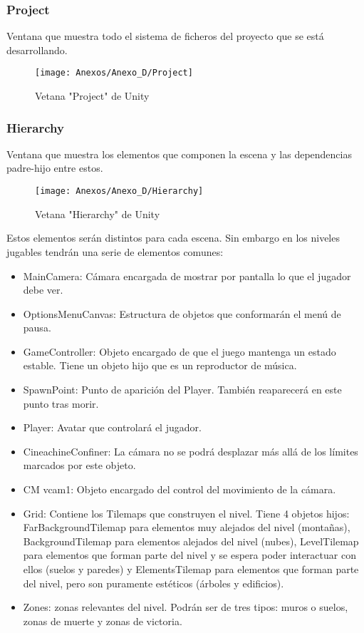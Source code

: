 \subsubsection{Project}
Ventana que muestra todo el sistema de ficheros del proyecto que se está desarrollando.

\begin{figure}[h]
\centering
\texttt{[image: Anexos/Anexo\_D/Project]}
\caption{Vetana "Project" de Unity}
\end{figure}
\clearpage

\subsubsection{Hierarchy}
Ventana que muestra los elementos que componen la escena y las dependencias padre-hijo entre estos.

\begin{figure}[h]
\centering
\texttt{[image: Anexos/Anexo\_D/Hierarchy]}
\caption{Vetana "Hierarchy" de Unity}
\end{figure}

Estos elementos serán distintos para cada escena. Sin embargo en los niveles jugables tendrán una serie de elementos comunes:
\begin{itemize}
\item
MainCamera: Cámara encargada de mostrar por pantalla lo que el jugador debe ver.
\item
OptionsMenuCanvas: Estructura de objetos que conformarán el menú de pausa.
\item
GameController: Objeto encargado de que el juego mantenga un estado estable. Tiene un objeto hijo que es un reproductor de música.
\item
SpawnPoint: Punto de aparición del Player. También reaparecerá en este punto tras morir.
\item
Player: Avatar que controlará el jugador.
\item
CineachineConfiner: La cámara no se podrá desplazar más allá de los límites marcados por este objeto.
\item
CM vcam1: Objeto encargado del control del movimiento de la cámara.
\item
Grid: Contiene los Tilemaps que construyen el nivel. Tiene 4 objetos hijos: FarBackgroundTilemap para elementos muy alejados del nivel (montañas), BackgroundTilemap para elementos alejados del nivel (nubes), LevelTilemap para elementos que forman parte del nivel y se espera poder interactuar con ellos (suelos y paredes) y ElementsTilemap para elementos que forman parte del nivel, pero son puramente estéticos (árboles y edificios).
\item
Zones: zonas relevantes del nivel. Podrán ser de tres tipos: muros o suelos, zonas de muerte y zonas de victoria.
\end{itemize}

